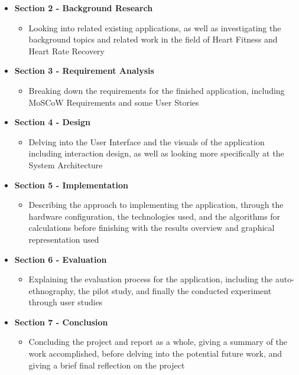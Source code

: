 \documentclass{l4proj}
\begin{document}
\begin{itemize}
    \item \textbf{Section 2 - Background Research}
    \begin{itemize}
        \item Looking into related existing applications, as well as investigating the background topics and related work in the field of Heart Fitness and Heart Rate Recovery
    \end{itemize}
    \item \textbf{Section 3 - Requirement Analysis}
    \begin{itemize}
        \item Breaking down the requirements for the finished application, including MoSCoW Requirements and some User Stories
    \end{itemize}
    \item \textbf{Section 4 - Design}
    \begin{itemize}
        \item Delving into the User Interface and the visuals of the application including interaction design, as well as looking more specifically at the System Architecture
    \end{itemize}
    \item \textbf{Section 5 - Implementation}
    \begin{itemize}
        \item Describing the approach to implementing the application, through the hardware configuration, the technologies used, and the algorithms for calculations before finishing with the results overview and graphical representation used
    \end{itemize}
    \item \textbf{Section 6 - Evaluation}
    \begin{itemize}
        \item Explaining the evaluation process for the application, including the auto-ethnography, the pilot study, and finally the conducted experiment through user studies
    \end{itemize}
    \item \textbf{Section 7 - Conclusion}
    \begin{itemize}
        \item Concluding the project and report as a whole, giving a summary of the work accomplished, before delving into the potential future work, and giving a brief final reflection on the project
    \end{itemize}
\end{itemize}
\end{document}
